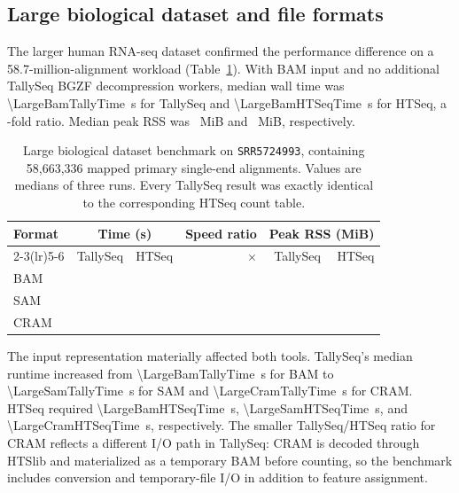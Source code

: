\documentclass[11pt]{article}
\begin{document}
\subsection{Large biological dataset and file formats}

The larger human RNA-seq dataset confirmed the performance difference on a 58.7-million-alignment workload (Table~\ref{tab:large-biological}). With BAM input and no additional TallySeq BGZF decompression workers, median wall time was \SI{\LargeBamTallyTime}{\second} for TallySeq and \SI{\LargeBamHTSeqTime}{\second} for HTSeq, a \LargeBamSpeedup{}-fold ratio. Median peak RSS was \LargeBamTallyRSS{}~MiB and \LargeBamHTSeqRSS{}~MiB, respectively.

\begin{table}[ht]
\centering
\caption{Large biological dataset benchmark on \texttt{SRR5724993}, containing 58,663,336 mapped primary single-end alignments. Values are medians of three runs. Every TallySeq result was exactly identical to the corresponding HTSeq count table.}
\label{tab:large-biological}
\begin{tabular}{lrrrrr}
\toprule
Format & \multicolumn{2}{c}{Time (s)} & Speed ratio & \multicolumn{2}{c}{Peak RSS (MiB)} \\
\cmidrule(lr){2-3}\cmidrule(lr){5-6}
 & TallySeq & HTSeq & $\times$ & TallySeq & HTSeq \\
\midrule
BAM  & \LargeBamTallyTime{}  & \LargeBamHTSeqTime{}  & \LargeBamSpeedup{}  & \LargeBamTallyRSS{}  & \LargeBamHTSeqRSS{} \\
SAM  & \LargeSamTallyTime{}  & \LargeSamHTSeqTime{}  & \LargeSamSpeedup{}  & \LargeSamTallyRSS{}  & \LargeSamHTSeqRSS{} \\
CRAM & \LargeCramTallyTime{} & \LargeCramHTSeqTime{} & \LargeCramSpeedup{} & \LargeCramTallyRSS{} & \LargeCramHTSeqRSS{} \\
\bottomrule
\end{tabular}
\end{table}

The input representation materially affected both tools. TallySeq's median runtime increased from \SI{\LargeBamTallyTime}{\second} for BAM to \SI{\LargeSamTallyTime}{\second} for SAM and \SI{\LargeCramTallyTime}{\second} for CRAM. HTSeq required \SI{\LargeBamHTSeqTime}{\second}, \SI{\LargeSamHTSeqTime}{\second}, and \SI{\LargeCramHTSeqTime}{\second}, respectively. The smaller TallySeq/HTSeq ratio for CRAM reflects a different I/O path in TallySeq: CRAM is decoded through HTSlib and materialized as a temporary BAM before counting, so the benchmark includes conversion and temporary-file I/O in addition to feature assignment.
\end{document}
